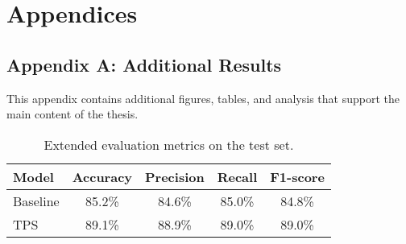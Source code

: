 \chapter{Appendices}

\section*{Appendix A: Additional Results}
\label{appendix:results}

This appendix contains additional figures, tables, and analysis that support the main content of the thesis.

\begin{table}[h!]
\centering
\begin{tabular}{lcccc}
\toprule
Model & Accuracy & Precision & Recall & F1-score \\
\midrule
Baseline & 85.2\% & 84.6\% & 85.0\% & 84.8\% \\
TPS      & 89.1\% & 88.9\% & 89.0\% & 89.0\% \\
\bottomrule
\end{tabular}
\caption{Extended evaluation metrics on the test set.}
\label{tab:full-metrics}
\end{table}